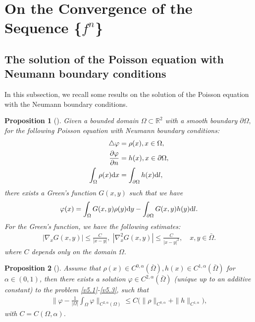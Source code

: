 \documentclass[11pt,reqno]{amsart}%
\newtheorem{Proposition}{Proposition}[section]
\theoremstyle{definition}
\theoremstyle{remark}
\begin{document}
\section{On the Convergence of the Sequence \{$f^{n}$\}}

\subsection{The solution of the Poisson equation with Neumann boundary conditions}
In this subsection, we recall some results on the solution of the Poisson equation with the Neumann boundary conditions.
\begin{Proposition}[\!\!\cite{E}]\label{P1}
Given a bounded domain $\Omega \subset \mathbb{R}^{2}$ with a smooth boundary $\partial\Omega,$ for the following Poisson equation with Neumann boundary conditions:
\begin{align}
\triangle \varphi&=\rho (x),  x\in \Omega,  \label{v5.1}\\
\frac{\partial \varphi}{\partial n}&= h(x), x\in\partial\Omega, \label{v5.2}\\
\int_{\Omega}\rho(x){\rm d}x&=\int_{\partial\Omega}h(x){\rm d}l, \label{v5.3}
\end{align}
  there exists a Green's function $G(x,y)$ such that we have
\begin{align}
\varphi(x)=\int_{\Omega}G(x,y)\rho(y){\rm d}y-\int_{\partial\Omega}G(x,y)h(y){\rm d}l.\label{v5.4}
\end{align}
For the Green's function, we have the following estimates:
\begin{align}
|\nabla_{x}G(x,y)|\leq \frac{C}{|x-y|},\,\,|\nabla^{2}_{x}G(x,y)|\leq \frac{C}{|x-y|^{2}},\quad x,y\in\bar{\Omega}. \label{v5.5}
\end{align}
where $C$ depends only on the domain $\Omega$.
\end{Proposition}

\begin{Proposition}[\!\!\cite{N}]\label{P2}
Assume that $\rho(x)\in C^{0,\alpha}(\bar{\Omega}), h(x)\in C^{1,\alpha}(\bar{\Omega})$ for $\alpha\in (0,1)$, then there exists
a solution $\varphi\in C^{2,\alpha}(\bar{\Omega})$ (unique up to an additive constant) to
the problem \eqref{v5.1}-\eqref{v5.3}, such that
\begin{align}
\Big\|\varphi-\frac{1}{|\Omega|}\int_{\Omega}\varphi\Big\|_{C^{2,\alpha}(\Omega)}\leq C\Big(\|\rho\|_{C^{0,\alpha}}+\|h\|_{C^{1,\alpha}}\Big), \label{v5.6}
\end{align}
with $C=C(\Omega,\alpha)$.
\end{Proposition}
\end{document}

